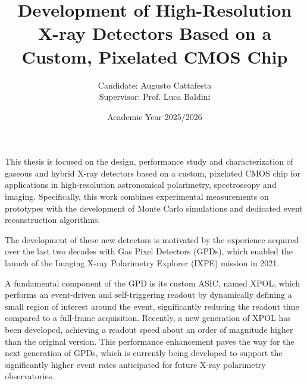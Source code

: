 \documentclass[12pt, a4paper]{article}
\title{Development of High-Resolution X-ray Detectors Based on a Custom, Pixelated CMOS Chip}
\author{Candidate: Augusto Cattafesta\\Supervisor: Prof. Luca Baldini}
\date{Academic Year 2025/2026}
\begin{document}
\maketitle

This thesis is focused on the design, performance study and characterization of gaseous and hybrid X-ray detectors based on a custom, pixelated CMOS chip for applications in high-resolution astronomical polarimetry, spectroscopy and imaging. Specifically, this work combines experimental measurements on prototypes with the development of Monte Carlo simulations and dedicated event reconstruction algorithms.

The development of these new detectors is motivated by the experience acquired over the last two decades with Gas Pixel Detectors (GPDs), which enabled the launch of the Imaging X-ray Polarimetry Explorer (IXPE) mission in 2021.



A fundamental component of the GPD is its custom ASIC, named XPOL, which performs an event-driven and self-triggering readout by dynamically defining a small region of interest around the event, significantly reducing the readout time compared to a full-frame acquisition. Recently, a new generation of XPOL has been developed, achieving a readout speed about an order of magnitude higher than the original version. This performance enhancement paves the way for the next generation of GPDs, which is currently being developed to support the significantly higher event rates anticipated for future X-ray polarimetry observatories.
\end{document}
